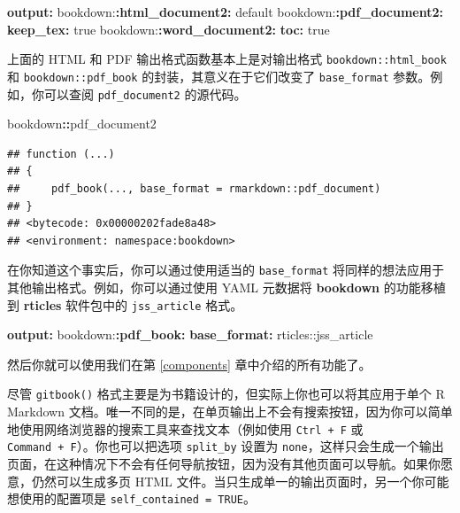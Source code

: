 \documentclass[
  12pt,
]{krantz}
\newenvironment{Shaded}{\begin{snugshade}}{\end{snugshade}}
\newcommand{\AttributeTok}[1]{\textcolor[rgb]{0.13,0.29,0.53}{#1}}
\newcommand{\CharTok}[1]{\textcolor[rgb]{0.31,0.60,0.02}{#1}}
\newcommand{\FunctionTok}[1]{\textcolor[rgb]{0.13,0.29,0.53}{\textbf{#1}}}
\newcommand{\KeywordTok}[1]{\textcolor[rgb]{0.13,0.29,0.53}{\textbf{#1}}}
\newcommand{\NormalTok}[1]{#1}
\newcommand{\SpecialCharTok}[1]{\textcolor[rgb]{0.81,0.36,0.00}{\textbf{#1}}}
\theoremstyle{definition}
\theoremstyle{definition}
\theoremstyle{definition}
\theoremstyle{definition}
\theoremstyle{remark}
\begin{document}
\begin{Shaded}
\begin{Highlighting}[]
\FunctionTok{output}\KeywordTok{:}
\AttributeTok{  bookdown:}\FunctionTok{:html\_document2}\KeywordTok{:}\AttributeTok{ default}
\AttributeTok{  bookdown:}\FunctionTok{:pdf\_document2}\KeywordTok{:}
\AttributeTok{    }\FunctionTok{keep\_tex}\KeywordTok{:}\AttributeTok{ }\CharTok{true}
\AttributeTok{  bookdown:}\FunctionTok{:word\_document2}\KeywordTok{:}
\AttributeTok{    }\FunctionTok{toc}\KeywordTok{:}\AttributeTok{ }\CharTok{true}
\end{Highlighting}
\end{Shaded}

上面的 HTML 和 PDF 输出格式函数基本上是对输出格式 \texttt{bookdown::html\_book} 和 \texttt{bookdown::pdf\_book} 的封装，其意义在于它们改变了 \texttt{base\_format} 参数。例如，你可以查阅 \texttt{pdf\_document2} 的源代码。

\begin{Shaded}
\begin{Highlighting}[]
\NormalTok{bookdown}\SpecialCharTok{::}\NormalTok{pdf\_document2}
\end{Highlighting}
\end{Shaded}

\begin{verbatim}
## function (...) 
## {
##     pdf_book(..., base_format = rmarkdown::pdf_document)
## }
## <bytecode: 0x00000202fade8a48>
## <environment: namespace:bookdown>
\end{verbatim}

在你知道这个事实后，你可以通过使用适当的 \texttt{base\_format} 将同样的想法应用于其他输出格式。例如，你可以通过使用 YAML 元数据将 \textbf{bookdown} 的功能移植到 \textbf{rticles} 软件包\citep{R-rticles}中的 \texttt{jss\_article} 格式。

\begin{Shaded}
\begin{Highlighting}[]
\FunctionTok{output}\KeywordTok{:}
\AttributeTok{  bookdown:}\FunctionTok{:pdf\_book}\KeywordTok{:}
\AttributeTok{    }\FunctionTok{base\_format}\KeywordTok{:}\AttributeTok{ rticles::jss\_article}
\end{Highlighting}
\end{Shaded}

然后你就可以使用我们在第 \ref{components} 章中介绍的所有功能了。

尽管 \texttt{gitbook()} 格式主要是为书籍设计的，但实际上你也可以将其应用于单个 R Markdown 文档。唯一不同的是，在单页输出上不会有搜索按钮，因为你可以简单地使用网络浏览器的搜索工具来查找文本（例如使用 \texttt{Ctrl\ +\ F} 或 \texttt{Command\ +\ F}）。你也可以把选项 \texttt{split\_by} 设置为 \texttt{none}，这样只会生成一个输出页面，在这种情况下不会有任何导航按钮，因为没有其他页面可以导航。如果你愿意，仍然可以生成多页 HTML 文件。当只生成单一的输出页面时，另一个你可能想使用的配置项是 \texttt{self\_contained\ =\ TRUE}。
\end{document}
